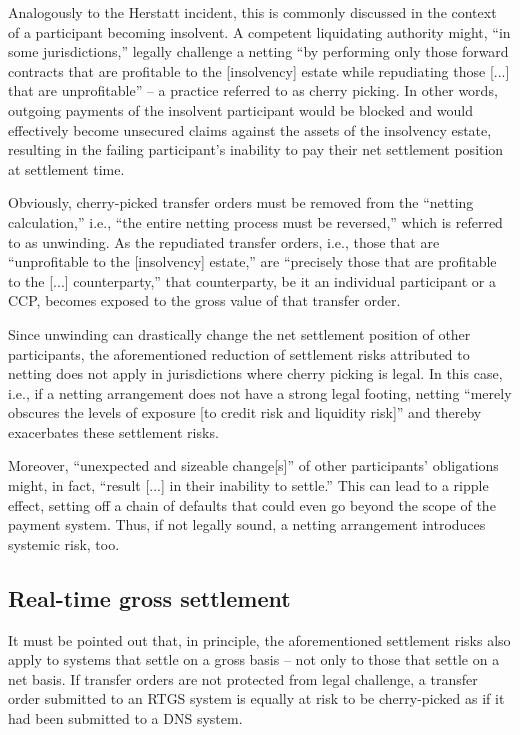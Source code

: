 Analogously to the Herstatt incident, this is commonly discussed in the context of a participant becoming insolvent.
A competent liquidating authority might, ``in some jurisdictions,'' legally challenge a netting ``by performing only those forward contracts that are profitable to the [insolvency] estate while repudiating those [...] that are unprofitable'' -- a practice referred to as cherry picking. \autocite[8]{cpmi1990}
In other words, outgoing payments of the insolvent participant would be blocked and would effectively become unsecured claims against the assets of the insolvency estate, resulting in the failing participant's inability to pay their net settlement position at settlement time.

Obviously, cherry-picked transfer orders must be removed from the ``netting calculation,'' i.e., ``the entire netting process must be reversed,'' which is referred to as unwinding. \autocite[41]{vereecken2003}
As the repudiated transfer orders, i.e., those that are ``unprofitable to the [insolvency] estate,'' are ``precisely those that are profitable to the [...] counterparty,'' that counterparty, be it an individual participant or a CCP, becomes exposed to the gross value of that transfer order. \autocite[8]{cpmi1990}

Since unwinding can drastically change the net settlement position of other participants, the aforementioned reduction of settlement risks attributed to netting does not apply in jurisdictions where cherry picking is legal.
In this case, i.e., if a netting arrangement does not have a strong legal footing, netting ``merely obscures the levels of exposure [to credit risk and liquidity risk]'' \autocite[40]{vereecken2003} and thereby exacerbates these settlement risks.

Moreover, ``unexpected and sizeable change[s]'' of other participants' obligations might, in fact, ``result [...] in their inability to settle.'' \autocite[41]{vereecken2003}
This can lead to a ripple effect, setting off a chain of defaults that could even go beyond the scope of the payment system.
Thus, if not legally sound, a netting arrangement introduces systemic risk, too.

\subsection{Real-time gross settlement}

It must be pointed out that, in principle, the aforementioned settlement risks also apply to systems that settle on a gross basis -- not only to those that settle on a net basis.
If transfer orders are not protected from legal challenge, a transfer order submitted to an RTGS system is equally at risk to be cherry-picked as if it had been submitted to a DNS system.

